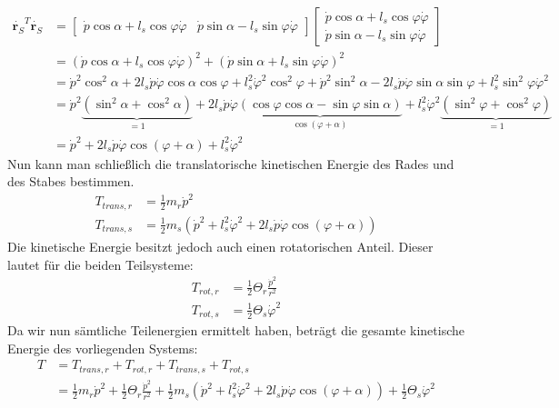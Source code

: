 	\begin{align*}
		\dot{\textbf{r}_S}^T\dot{\textbf{r}_S} &= \left[\begin{matrix}
		\dot{p}\cos\alpha + l_s\cos\varphi\dot{\varphi} & \dot{p}\sin\alpha - l_s\sin\varphi\dot{\varphi}
		\end{matrix}\right] \left[\begin{matrix}
		\dot{p}\cos\alpha + l_s\cos\varphi\dot{\varphi} \\
		\dot{p}\sin\alpha - l_s\sin\varphi\dot{\varphi}
		\end{matrix}\right] \\
		&=\left(\dot{p}\cos\alpha + l_s\cos\varphi\dot{\varphi}\right)^2 + \left(\dot{p}\sin\alpha + l_s\sin\varphi\dot{\varphi}\right)^2 \\
		&=\dot{p}^2\cos^2\alpha + 2l_s\dot{p}\dot{\varphi}\cos\alpha\cos\varphi + l_s^2\dot{\varphi}^2\cos^2\varphi + \dot{p}^2\sin^2\alpha - 2l_s\dot{p}\dot{\varphi}\sin\alpha\sin\varphi + l_s^2\sin^2\varphi\dot{\varphi}^2 \\
		&=\dot{p}^2\underbrace{\left(\sin^2\alpha + \cos^2\alpha\right)}_{=1} + 2l_s\dot{p}\dot{\varphi}\underbrace{\left(\cos\varphi\cos\alpha - \sin\varphi\sin\alpha\right)}_{\cos\left(\varphi + \alpha\right)} + l_s^2\dot{\varphi}^2\underbrace{\left(\sin^2\varphi + \cos^2\varphi\right)}_{=1} \\
		&= \dot{p}^2 + 2l_s\dot{p}\dot{\varphi}\cos\left(\varphi + \alpha\right) + l_s^2\dot{\varphi}^2
	\end{align*}
	Nun kann man schließlich die translatorische kinetischen Energie des Rades und des Stabes bestimmen.
	\begin{align*}
		T_{trans,r} &=  \frac{1}{2}m_r\dot{p}^2\\
		T_{trans,s} &=  \frac{1}{2}m_s\left(\dot{p}^2 + l_s^2\dot{\varphi}^2 + 2l_s\dot{p}\dot {\varphi}\cos\left(\varphi + \alpha\right)\right)
	\end{align*}
	Die kinetische Energie besitzt jedoch auch einen rotatorischen Anteil. Dieser lautet für die beiden Teilsysteme:
	\begin{align*}
		T_{rot,r} &= \frac{1}{2} \Theta_r \frac{\dot{p}^2}{r^2} \\
		T_{rot,s} &= \frac{1}{2} \Theta_s \dot{\varphi}^2
	\end{align*}
	Da wir nun sämtliche Teilenergien ermittelt haben, beträgt die gesamte kinetische Energie des vorliegenden Systems:
	\begin{align*}
		T &= T_{trans,r} + T_{rot,r} + T_{trans,s} + T_{rot,s}\\
		  &= \frac{1}{2}m_r\dot{p}^2 + \frac{1}{2} \Theta_r \frac{\dot{p}^2}{r^2} + \frac{1}{2}m_s\left(\dot{p}^2 + l_s^2\dot{\varphi}^2 + 2l_s\dot{p}\dot{\varphi}\cos\left(\varphi + \alpha\right)\right) + \frac{1}{2} \Theta_s \dot{\varphi}^2
	\end{align*}
